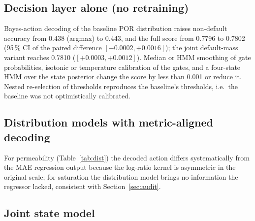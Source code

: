 \documentclass[preprint,12pt]{elsarticle}
\begin{document}
\subsection{Decision layer alone (no retraining)}

Bayes-action decoding of the baseline POR distribution raises non-default accuracy from 0.438 (argmax) to 0.443, and the full score from 0.7796 to 0.7802 (95\,\% CI of the paired difference $[-0.0002,+0.0016]$); the joint default-mass variant reaches 0.7810 ($[+0.0003,+0.0012]$). Median or HMM \cite{rabiner1989hmm} smoothing of gate probabilities, isotonic or temperature calibration of the gates, and a four-state HMM over the state posterior change the score by less than 0.001 or reduce it. Nested re-selection of thresholds reproduces the baseline's thresholds, i.e.\ the baseline was not optimistically calibrated.

\subsection{Distribution models with metric-aligned decoding}

\begin{table}[t]
\centering
\caption{Distribution models decoded with the official kernel, evaluated with the baseline gates (5-fold CV).}
\label{tab:dist}
\small
{}
\end{table}

For permeability (Table~\ref{tab:dist}) the decoded action differs systematically from the MAE regression output because the log-ratio kernel is asymmetric in the original scale; for saturation the distribution model brings no information the regressor lacked, consistent with Section~\ref{sec:audit}.

\subsection{Joint state model}
\end{document}
